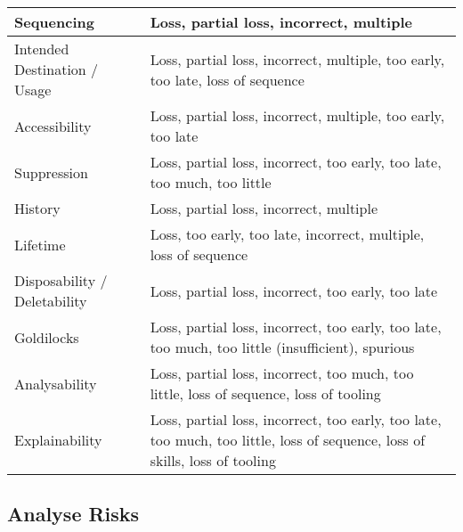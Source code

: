 \begin{longtable}{|L{}|L{}|}
  {Sequencing} & {Loss, partial loss, incorrect, multiple}\\\hline
  {Intended Destination / Usage} & {Loss, partial loss, incorrect, multiple, too early, too late, loss of sequence}\\\hline
  {Accessibility} & {Loss, partial loss, incorrect, multiple, too early, too late}\\\hline
  {Suppression} & {Loss, partial loss, incorrect, too early, too late, too much, too little}\\\hline
  {History} & {Loss, partial loss, incorrect, multiple}\\\hline
  {Lifetime} & {Loss, too early, too late, incorrect, multiple, loss of sequence}\\\hline
  {Disposability / Deletability} & {Loss, partial loss, incorrect, too early, too late}\\\hline
  {Goldilocks} & {Loss, partial loss, incorrect, too early, too late, too much,
    too little (insufficient), spurious}\\\hline
  {Analysability} & {Loss, partial loss, incorrect, too much, too little, loss of sequence, loss of tooling}\\\hline
  {Explainability} & {Loss, partial loss, incorrect, too early, too late, too much, too little, loss of sequence, loss of skills, loss of tooling}\\\hline
\end{longtable}

\clearpage
\subsection{Analyse Risks}
